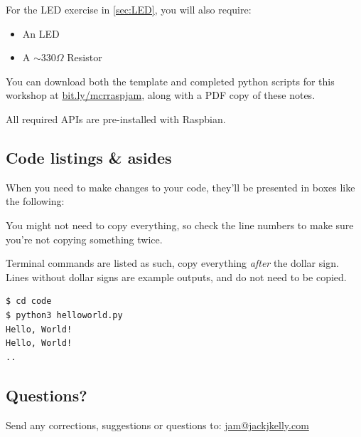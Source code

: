 \documentclass[a4paper, twocolumn, twoside, 11pt]{article}
\begin{document}
			For the LED exercise in \autoref{sec:LED}, you will also require:
			
			\begin{itemize}[noitemsep]	
				\item An LED
				\item A $\sim 330 \Omega$ Resistor
			\end{itemize}
				
			You can download both the template and completed python scripts for this workshop at \url{bit.ly/mcrraspjam}, along with a PDF copy of these notes.
			
			All required APIs are pre-installed with Raspbian.
			
	
		\subsection*{Code listings \& asides}
	
			When you need to make changes to your code, they'll be presented in boxes like the following:

			
	
			You might not need to copy everything, so check the line numbers to make sure you're not copying something twice.
			
			Terminal commands are listed as such, copy everything \textit{after} the dollar sign. Lines without dollar signs are example outputs, and do not need to be copied.
			
			\begin{lstlisting}
$ cd code
$ python3 helloworld.py 
Hello, World!
Hello, World!
..
			\end{lstlisting}
		
		\subsection*{Questions?}
		
			Send any corrections, suggestions or questions to:
			\url{jam@jackjkelly.com}\label{email}
	
	
 	\newpage
	
	
	
\end{document}
